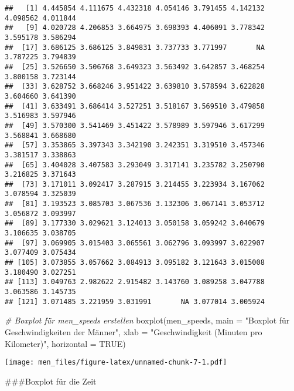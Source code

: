 \documentclass[
]{article}
\newenvironment{Shaded}{\begin{snugshade}}{\end{snugshade}}
\newcommand{\AttributeTok}[1]{\textcolor[rgb]{0.77,0.63,0.00}{#1}}
\newcommand{\CommentTok}[1]{\textcolor[rgb]{0.56,0.35,0.01}{\textit{#1}}}
\newcommand{\ConstantTok}[1]{\textcolor[rgb]{0.00,0.00,0.00}{#1}}
\newcommand{\FunctionTok}[1]{\textcolor[rgb]{0.00,0.00,0.00}{#1}}
\newcommand{\NormalTok}[1]{#1}
\newcommand{\OtherTok}[1]{\textcolor[rgb]{0.56,0.35,0.01}{#1}}
\newcommand{\SpecialCharTok}[1]{\textcolor[rgb]{0.00,0.00,0.00}{#1}}
\newcommand{\StringTok}[1]{\textcolor[rgb]{0.31,0.60,0.02}{#1}}
\begin{document}
\begin{verbatim}
##   [1] 4.445854 4.111675 4.432318 4.054146 3.791455 4.142132 4.098562 4.011844
##   [9] 4.020728 4.206853 3.664975 3.698393 4.406091 3.778342 3.595178 3.586294
##  [17] 3.686125 3.686125 3.849831 3.737733 3.771997       NA 3.787225 3.794839
##  [25] 3.526650 3.506768 3.649323 3.563492 3.642857 3.468254 3.800158 3.723144
##  [33] 3.628752 3.668246 3.951422 3.639810 3.578594 3.622828 3.604660 3.641390
##  [41] 3.633491 3.686414 3.527251 3.518167 3.569510 3.479858 3.516983 3.597946
##  [49] 3.570300 3.541469 3.451422 3.578989 3.597946 3.617299 3.568841 3.668680
##  [57] 3.353865 3.397343 3.342190 3.242351 3.319510 3.457346 3.381517 3.338863
##  [65] 3.404028 3.407583 3.293049 3.317141 3.235782 3.250790 3.216825 3.371643
##  [73] 3.171011 3.092417 3.287915 3.214455 3.223934 3.167062 3.078594 3.325039
##  [81] 3.193523 3.085703 3.067536 3.132306 3.067141 3.053712 3.056872 3.093997
##  [89] 3.177330 3.029621 3.124013 3.050158 3.059242 3.040679 3.106635 3.038705
##  [97] 3.069905 3.015403 3.065561 3.062796 3.093997 3.022907 3.077409 3.075434
## [105] 3.073855 3.057662 3.084913 3.095182 3.121643 3.015008 3.180490 3.027251
## [113] 3.049763 2.982622 2.915482 3.143760 3.089258 3.047788 3.063586 3.145735
## [121] 3.071485 3.221959 3.031991       NA 3.077014 3.005924
\end{verbatim}

\begin{Shaded}
\begin{Highlighting}[]
\CommentTok{\# Boxplot für men\_speeds erstellen}
\FunctionTok{boxplot}\NormalTok{(men\_speeds, }\AttributeTok{main =} \StringTok{"Boxplot für Geschwindigkeiten der Männer"}\NormalTok{, }\AttributeTok{xlab =} \StringTok{"Geschwindigkeit (Minuten pro Kilometer)"}\NormalTok{, }\AttributeTok{horizontal =} \ConstantTok{TRUE}\NormalTok{)}
\end{Highlighting}
\end{Shaded}

\texttt{[image: men\_files/figure-latex/unnamed-chunk-7-1.pdf]}

\#\#\#Boxplot für die Zeit

\begin{Shaded}
\end{Shaded}
\end{document}
